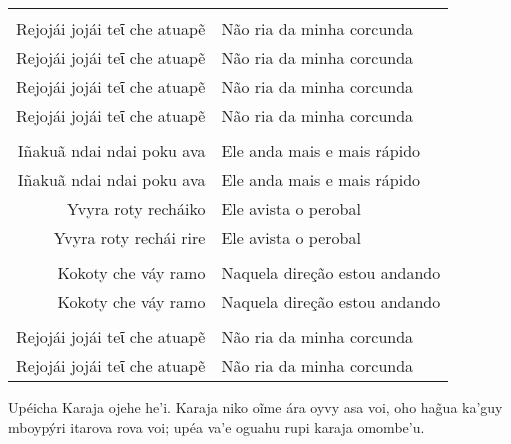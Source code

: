 \begin{itemize}
\begin{table}[]
\begin{tabular}{rl}
                  &                     \\
Rejojái jojái teῖ che atuapẽ          & Não ria da minha corcunda           \\
Rejojái jojái teῖ che atuapẽ          & Não ria da minha corcunda           \\
Rejojái jojái teῖ che atuapẽ          & Não ria da minha corcunda           \\
Rejojái jojái teῖ che atuapẽ          & Não ria da minha corcunda           \\	
                  &                     \\
Iñakuã ndai ndai poku ava          & Ele anda mais e mais rápido           \\
Iñakuã ndai ndai poku ava          & Ele anda mais e mais rápido           \\
Yvyra roty recháiko          & Ele avista o perobal           \\
Yvyra roty rechái rire          & Ele avista o perobal           \\
                  &                     \\
Kokoty che váy ramo          & Naquela direção estou andando           \\
Kokoty che váy ramo          & Naquela direção estou andando           \\
                  &                     \\
Rejojái jojái teῖ che atuapẽ          & Não ria da minha corcunda           \\
Rejojái jojái teῖ che atuapẽ          & Não ria da minha corcunda           \\
\end{tabular}
\end{table}





Upéicha Karaja ojehe he'i. Karaja niko oĩme ára oyvy asa voi, oho hag̃ua
ka'guy mboypýri itarova rova voi; upéa va'e oguahu rupi karaja omombe'u.


\end{itemize}
